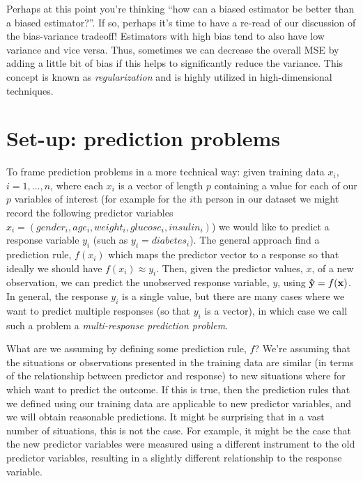 Perhaps at this point you're thinking ``how can a biased estimator be better than a biased estimator?''. If so, perhaps it's time to have a re-read of our discussion of the bias-variance tradeoff! Estimators with high bias tend to also have low variance and vice versa. Thus, sometimes we can decrease the overall MSE by adding a little bit of bias if this helps to significantly reduce the variance. This concept is known as \textit{regularization} and is highly utilized in high-dimensional techniques.


\section{Set-up: prediction problems}


To frame prediction problems in a more technical way: given training data $x_i$, $i = 1, ..., n$, where each $x_i$ is a vector of length $p$ containing a value for each of our $p$ variables of interest (for example for the $i$th person in our dataset we might record the following predictor variables $x_i = (gender_i, age_i, weight_i, glucose_i, insulin_i)$) we would like to predict a response variable $y_i$ (such as $y_i = diabetes_i$). The general approach find a prediction rule, $f(x_i)$ which maps the predictor vector to a response so that ideally we should have $f(x_i) \approx y_i$. Then, given the predictor values, $x$, of a new observation, we can predict the unobserved response variable, $y$, using ${\bf \hat{y}} = f({\bf x})$. In general, the response $y_i$ is a single value, but there are many cases where we want to predict multiple responses (so that $y_i$ is a vector), in which case we call such a problem a \textit{multi-response prediction problem}.

What are we assuming by defining some prediction rule, $f$? We're assuming that the situations or observations presented in the training data are similar (in terms of the relationship between predictor and response) to new situations where for which want to predict the outcome. If this is true, then the prediction rules that we defined using our training data are applicable to new predictor variables, and we will obtain reasonable predictions. It might be surprising that in a vast number of situations, this is not the case. For example, it might be the case that the new predictor variables were measured using a different instrument to the old predictor variables, resulting in a slightly different relationship to the response variable.






